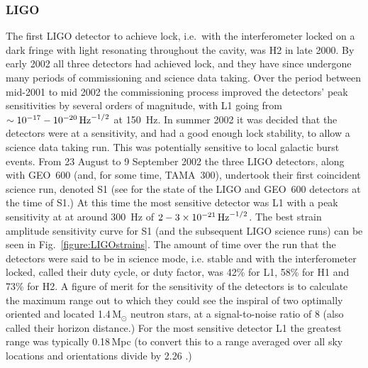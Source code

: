 \documentclass{article}
\begin{document}

\subsubsection{LIGO}
The first LIGO detector to achieve lock, i.e.\ with the interferometer locked on
a dark fringe with light resonating throughout the cavity, was H2 in late 2000. 
By early 2002 all three detectors had achieved lock, and they have since undergone
many periods of commissioning and science data taking. Over the period between
mid-2001 to mid 2002 the commissioning process improved the detectors' peak
sensitivities by several orders of magnitude, with L1 going from
$\sim10^{-17}-10^{-20}\,{\rm Hz}^{-1/2}$ at 150~Hz. In summer 2002 it was
decided that the detectors were at a sensitivity, and had a good enough lock
stability, to allow a science data taking run. This was potentially sensitive to
local galactic burst events. From 23 August to 9 September 2002 the three LIGO
detectors, along with GEO~600 (and, for some time, TAMA~300), undertook their
first coincident science run, denoted S1 (see \cite{Abbott:2004a} for the state
of the LIGO and GEO~600 detectors at the time of S1.) At this time the most
sensitive detector was L1 with a peak sensitivity at at around 300~Hz of
$2-3\times10^{-21}\,{\rm Hz}^{-1/2}$. The best strain amplitude sensitivity
curve for S1 (and the subsequent LIGO science runs) can be seen in
Fig.~\ref{figure:LIGOstrains}. The amount of time over the run that the
detectors were said to be in science mode, i.e. stable and with the
interferometer locked, called their duty cycle, or duty factor, was 42\% for L1,
58\% for H1 and 73\% for H2. A figure of merit for the sensitivity of the
detectors is to calculate the maximum range out to which they could see the
inspiral of two optimally oriented and located 1.4\,M$_{\odot}$ neutron stars,
at a signal-to-noise ratio of 8 \cite{Abbott:2005b} (also called their horizon
distance.) For the most sensitive detector L1 the greatest range was typically
0.18\,Mpc (to convert this to a range averaged over all sky locations and
orientations divide by 2.26 \cite{Sutton:2003}.)
\end{document}

